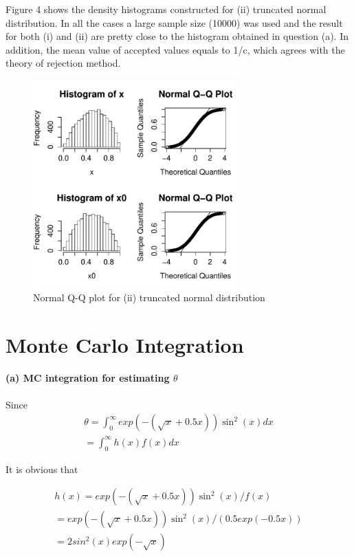 \documentclass[10pt, letterpaper]{proc}
\begin{document}
Figure 4 shows the density histograms constructed for (ii) truncated normal distribution. In all the cases a large sample size (10000) was used and the result for both (i) and (ii) are pretty close to the histogram obtained in question (a). In addition, the mean value of accepted values equals to 1/c, which agrees with the theory of rejection method.

\begin{figure}
	\centering \includegraphics[width=8cm]{truncated}
	\caption{Normal Q-Q plot for (ii) truncated normal distribution}
\end{figure}


\section{Monte Carlo Integration}

\paragraph{(a) MC integration for estimating $\theta$}Since 
\begin{equation}
\begin{aligned}
\theta = \int_{0}^{\infty} exp (-(\sqrt{x}+0.5x))\sin^2(x) dx  \\ = \int_{0}^{\infty} h(x) f(x) dx 
\end{aligned}
\end{equation}

It is obvious that 

\begin{equation}
\begin{aligned}
h(x) = exp (-(\sqrt{x}+0.5x))\sin^2(x) / f(x) \\ = exp (-(\sqrt{x}+0.5x))\sin^2(x)/ (0.5 exp(-0.5x)) \\ = 2 sin^2(x) exp(-\sqrt{x})
\end{aligned}
\end{equation}
\end{document}

